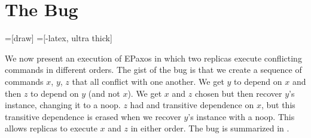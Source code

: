 \documentclass{mwhittaker}
\begin{document}
\section{The Bug}
\newcommand{\preaccepted}{\textbf{pre}}
\newcommand{\accepted}{\textbf{acc}}
\newcommand{\committed}{\textbf{comm}}
\newcommand{\noop}{\bot}

=[draw]
=[-latex, ultra thick]

We now present an execution of EPaxos in which two replicas execute conflicting
commands in different orders. The gist of the bug is that we create a sequence
of commands $x$, $y$, $z$ that all conflict with one another. We get $y$ to
depend on $x$ and then $z$ to depend on $y$ (and not $x$). We get $x$ and $z$
chosen but then recover $y$'s instance, changing it to a noop. $z$ had and
transitive dependence on $x$, but this transitive dependence is erased when we
recover $y$'s instance with a noop. This allows replicas to execute $x$ and $z$
in either order. The bug is summarized in .
\end{document}
